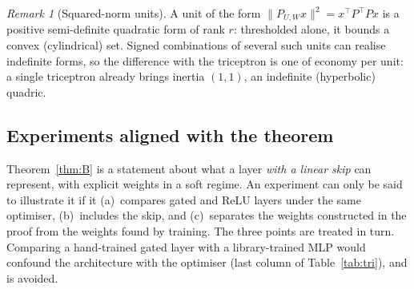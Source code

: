 \documentclass[11pt,a4paper]{article}
\theoremstyle{plain}
\theoremstyle{definition}
\theoremstyle{remark}
\newtheorem{remark}{Remark}
\newcommand{\T}{\top}
\begin{document}
\begin{remark}[Squared-norm units]
A unit of the form $\|P_{U,W}x\|^2=x^\T P^\T Px$ is a positive
semi-definite quadratic form of rank $r$: thresholded alone, it bounds a
convex (cylindrical) set. Signed combinations of several such units can
realise indefinite forms, so the difference with the triceptron is one of
economy per unit: a single triceptron already brings inertia $(1,1)$, an
indefinite (hyperbolic) quadric.
\end{remark}

\subsection{Experiments aligned with the theorem}
\label{sec:tri-exp}
Theorem~\ref{thm:B} is a statement about what a layer \emph{with a linear
skip} can represent, with explicit weights in a soft regime. An experiment
can only be said to illustrate it if it (a)~compares gated and ReLU layers
under the same optimiser, (b)~includes the skip, and (c)~separates the
weights constructed in the proof from the weights found by training. The
three points are treated in turn. Comparing a hand-trained gated layer
with a library-trained MLP would confound the architecture with the
optimiser (last column of Table~\ref{tab:tri}), and is avoided.
\end{document}
